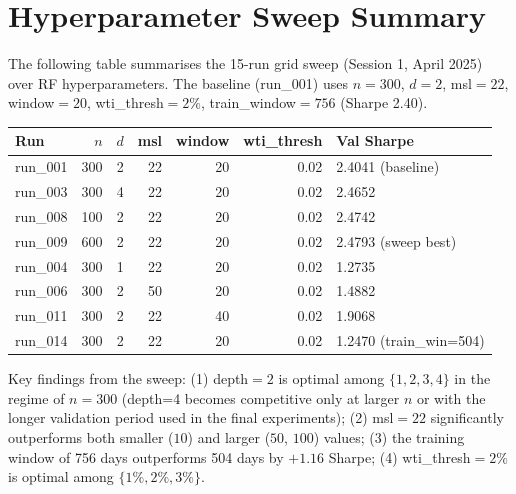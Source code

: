 \documentclass{article}
\begin{document}
\appendix
\section{Hyperparameter Sweep Summary}

The following table summarises the 15-run grid sweep (Session 1, April 2025) over
RF hyperparameters. The baseline (run\_001) uses $n=300$, $d=2$, msl$=22$,
window$=20$, wti\_thresh$=2\%$, train\_window$=756$ (Sharpe 2.40).

\begin{center}
\small
\begin{tabular}{lrrrrrl}
\toprule
Run & $n$ & $d$ & msl & window & wti\_thresh & Val Sharpe \\
\midrule
run\_001 & 300 & 2 & 22 & 20 & 0.02 & 2.4041 (baseline) \\
run\_003 & 300 & 4 & 22 & 20 & 0.02 & 2.4652 \\
run\_008 & 100 & 2 & 22 & 20 & 0.02 & 2.4742 \\
run\_009 & 600 & 2 & 22 & 20 & 0.02 & 2.4793 (sweep best) \\
run\_004 & 300 & 1 & 22 & 20 & 0.02 & 1.2735 \\
run\_006 & 300 & 2 & 50 & 20 & 0.02 & 1.4882 \\
run\_011 & 300 & 2 & 22 & 40 & 0.02 & 1.9068 \\
run\_014 & 300 & 2 & 22 & 20 & 0.02 & 1.2470 (train\_win=504) \\
\bottomrule
\end{tabular}
\end{center}

Key findings from the sweep: (1) depth$=2$ is optimal among $\{1, 2, 3, 4\}$
in the regime of $n=300$ (depth=4 becomes competitive only at larger $n$ or with
the longer validation period used in the final experiments); (2) msl$=22$
significantly outperforms both smaller ($10$) and larger ($50$, $100$) values;
(3) the training window of 756 days outperforms 504 days by $+1.16$ Sharpe;
(4) wti\_thresh$=2\%$ is optimal among $\{1\%, 2\%, 3\%\}$.
\end{document}
